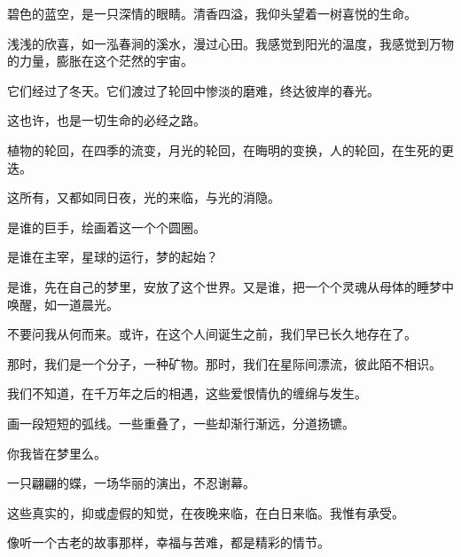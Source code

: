 		碧色的蓝空，是一只深情的眼睛。清香四溢，我仰头望着一树喜悦的生命。\par
		浅浅的欣喜，如一泓春涧的溪水，漫过心田。我感觉到阳光的温度，我感觉到万物的力量，膨胀在这个茫然的宇宙。\par
		它们经过了冬天。它们渡过了轮回中惨淡的磨难，终达彼岸的春光。\par
		这也许，也是一切生命的必经之路。\par
		植物的轮回，在四季的流变，月光的轮回，在晦明的变换，人的轮回，在生死的更迭。\par
		这所有，又都如同日夜，光的来临，与光的消隐。\par
		是谁的巨手，绘画着这一个个圆圈。\par
		是谁在主宰，星球的运行，梦的起始？\par
		是谁，先在自己的梦里，安放了这个世界。又是谁，把一个个灵魂从母体的睡梦中唤醒，如一道晨光。\par
		不要问我从何而来。或许，在这个人间诞生之前，我们早已长久地存在了。\par
		那时，我们是一个分子，一种矿物。那时，我们在星际间漂流，彼此陌不相识。\par
		我们不知道，在千万年之后的相遇，这些爱恨情仇的缠绵与发生。\par
		画一段短短的弧线。一些重叠了，一些却渐行渐远，分道扬镳。\par
		你我皆在梦里么。\par
		一只翩翩的蝶，一场华丽的演出，不忍谢幕。\par
		这些真实的，抑或虚假的知觉，在夜晚来临，在白日来临。我惟有承受。\par
		像听一个古老的故事那样，幸福与苦难，都是精彩的情节。

	\endwriting



